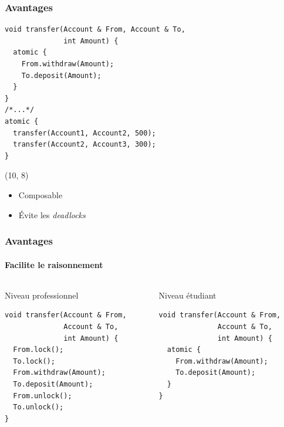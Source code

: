 \documentclass{beamer}
\begin{document}
\begin{frame}[fragile]
\frametitle{Avantages}
\begin{adjustbox}{width=\textwidth,height=\someheight,keepaspectratio}
\begin{lstlisting}
void transfer(Account & From, Account & To, 
              int Amount) {
  atomic {
    From.withdraw(Amount);
    To.deposit(Amount);
  }
}
/*...*/
atomic {
  transfer(Account1, Account2, 500);
  transfer(Account2, Account3, 300);
}
\end{lstlisting}
\end{adjustbox}

\begin{textblock}{5}(10, 8)
	 \begin{itemize}
	 \item Composable
	 \item<2-> Évite les \textit{deadlocks}
	 \end{itemize}
\end{textblock}
\end{frame}

\begin{frame}[fragile]
\frametitle{Avantages}
\framesubtitle{Facilite le raisonnement}
\begin{columns}
    \begin{column}{0.5\textwidth}
    Niveau professionnel
    \begin{adjustbox}{width=\textwidth,height=\someheight,keepaspectratio}
        \begin{lstlisting}  
void transfer(Account & From, 
              Account & To, 
              int Amount) {
  From.lock();
  To.lock();
  From.withdraw(Amount);
  To.deposit(Amount);
  From.unlock();
  To.unlock();
}
        \end{lstlisting}
        \end{adjustbox}
    \end{column}
    \begin{column}{0.5\textwidth}
    Niveau étudiant
    \begin{adjustbox}{width=\textwidth,height=\someheight,keepaspectratio}
        \begin{lstlisting}        
void transfer(Account & From, 
              Account & To, 
              int Amount) {
  atomic {
    From.withdraw(Amount);
    To.deposit(Amount);
  }
}
        \end{lstlisting}
        \end{adjustbox}
    \end{column}
\end{columns}
\end{frame}
\end{document}
